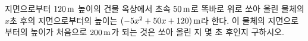 지면으로부터 $120\mkern3mu \mathrm{m}$ 높이의 건물 옥상에서 초속 $50\mkern3mu \mathrm{m}$로 똑바로 위로 쏘아 올린 물체의 $x$초 후의 지면으로부터의 높이는 $(-5x^2+50x+120)\mkern3mu \mathrm{m}$라 한다. 이 물체의 지면으로부터의 높이가 처음으로 $200\mkern3mu \mathrm{m}$가 되는 것은 쏘아 올린 지 몇 초 후인지 구하시오.
